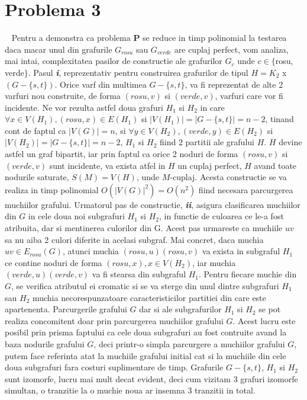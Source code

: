 \documentclass{article}
\begin{document}
\section{Problema 3}
\
\newline
Pentru a demonstra ca problema \textbf{P} se reduce in timp polinomial la testarea daca macar unul din grafurile $G_{rosu}$ sau $G_{verde}$ are cuplaj perfect, vom analiza, mai intai, complexitatea pasilor de constructie ale grafurilor $G_c$ unde $c \in \{$rosu, verde$\}$.
\newline
\newline
Pasul \textbf{\textit{i}}, reprezentativ pentru construirea grafurilor de tipul $H=K_2$ x $(G-\{s,t\})$. Orice varf din multimea $G-\{s,t\}$, va fi reprezentat de alte 2 varfuri nou construite, de forma $(rosu, v)$ si $(verde,v)$, varfuri care vor fi incidente. Ne vor rezulta astfel doua grafuri $H_1$ si $H_2$ in care $\forall x \in V(H_1), (rosu, x) \in E(H_1)$ si $|V(H_1)|=|G-\{s,t\}|=n-2$, tinand cont de faptul ca $|V(G)|=n$, si $\forall y \in V(H_2), (verde, y) \in E(H_2)$ si $|V(H_2)|=|G-\{s,t\}|=n-2$, $H_1$ si $H_2$ fiind 2 partitii ale grafului $H$. $H$ devine astfel un graf bipartit, iar prin faptul ca orice 2 noduri de forma $(rosu, v)$ si $(verde,v)$ sunt incidente, va exista atfel in $H$ un cuplaj perfect, $H$ avand toate nodurile saturate, $S(M)=V(H)$, unde $M$-cuplaj. Acesta constructie se va realiza in timp polinomial $O(|V(G)|^2)=O(n^2)$ fiind necesara parcurgerea muchiilor grafului.
\newline
\newline
Urmatorul pas de constructie, \textbf{\textit{ii}}, asigura clasificarea muchiilor din $G$ in cele doua noi subgrafuri $H_1$ si $H_2$, in functie de culoarea ce le-a fost atribuita, dar si mentinerea culorilor din G. Acest pas urmareste ca muchiile $uv$ sa nu aiba 2 culori diferite in acelasi subgraf. Mai concret, daca muchia $uv \in E_{rosu}(G)$, atunci muchia $(rosu, u)(rosu,v)$ va exista in subgraful $H_1$ ce contine noduri de forma $(rosu, x), x\in V(H_2)$, iar muchia $(verde,u)(verde,v)$ va fi stearsa din subgraful $H_1$. Pentru fiecare muchie din $G$, se verifica atributul ei cromatic si se va sterge din unul dintre subgrafuri $H_1$ sau $H_2$ muchia necorespunzatoare caracteristicilor partitiei din care este apartenenta. 
\newline
\newline
Parcurgerile grafului $G$ dar si ale subgrafurilor $H_1$ si $H_2$ se pot realiza concomitent doar prin parcurgerea muchiilor grafului $G$. Acest lucru este posibil prin prisma faptului ca cele doua subgrafuri au fost contruite avand la baza nodurile grafului $G$, deci printr-o simpla parcurgere a muchiilor grafului $G$, putem face referinta atat la muchiile grafului initial cat si la muchiile din cele doua subgrafuri fara costuri suplimentare de timp. Grafurile $G-\{s,t\}$, $H_1$ si $H_2$ sunt izomorfe, lucru  mai mult decat evident, deci cum vizitam 3 grafuri izomorfe simultan, o tranzitie la o muchie noua ar insemna 3 tranzitii in total.
\end{document}
